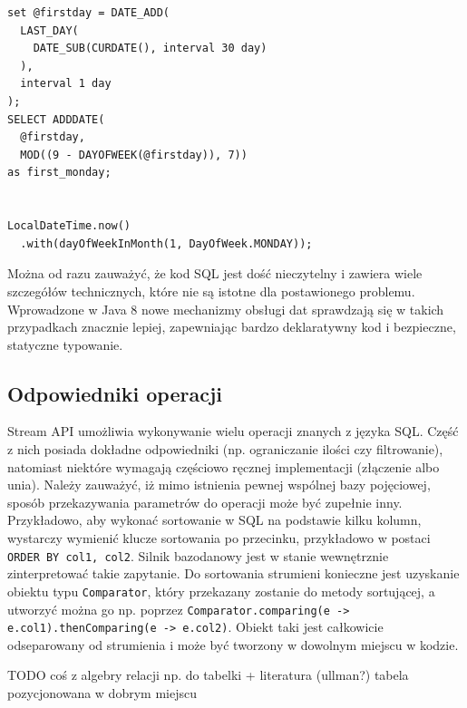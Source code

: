 \documentclass[12pt,twoside,openright]{extarticle}
\begin{document}
\begin{lstlisting}[label=date, caption=Problem znalezienia pierwszego poniedziałku w miesiącu]
set @firstday = DATE_ADD(
  LAST_DAY(
    DATE_SUB(CURDATE(), interval 30 day)
  ),
  interval 1 day
);
SELECT ADDDATE(
  @firstday,
  MOD((9 - DAYOFWEEK(@firstday)), 7))
as first_monday;


LocalDateTime.now()
  .with(dayOfWeekInMonth(1, DayOfWeek.MONDAY));
\end{lstlisting}

Można od razu zauważyć, że kod SQL jest dość nieczytelny i zawiera wiele szczegółów technicznych, które nie są istotne dla postawionego problemu. Wprowadzone w Java 8 nowe mechanizmy obsługi dat sprawdzają się w takich przypadkach znacznie lepiej, zapewniając bardzo deklaratywny kod i bezpieczne, statyczne typowanie.


\subsection{Odpowiedniki operacji} \label{counterparts}

    Stream API umożliwia wykonywanie wielu operacji znanych z języka SQL. Część z nich posiada dokładne odpowiedniki (np. ograniczanie ilości czy filtrowanie), natomiast niektóre wymagają częściowo ręcznej implementacji (złączenie albo unia). Należy zauważyć, iż mimo istnienia pewnej wspólnej bazy pojęciowej, sposób przekazywania parametrów do operacji może być zupełnie inny. Przykładowo, aby wykonać sortowanie w SQL na podstawie kilku kolumn, wystarczy wymienić klucze sortowania po przecinku, przykładowo w postaci \texttt{ORDER BY col1, col2}. Silnik bazodanowy jest w stanie wewnętrznie zinterpretować takie zapytanie. Do sortowania strumieni konieczne jest uzyskanie obiektu typu \texttt{Comparator}, który przekazany zostanie do metody sortującej, a utworzyć można go np. poprzez \texttt{Comparator.comparing(e -> e.col1).thenComparing(e -> e.col2)}. Obiekt taki jest całkowicie odseparowany od strumienia i może być tworzony w dowolnym miejscu w kodzie.

TODO coś z algebry relacji np. do tabelki + literatura (ullman?) tabela pozycjonowana w dobrym miejscu
\end{document}
